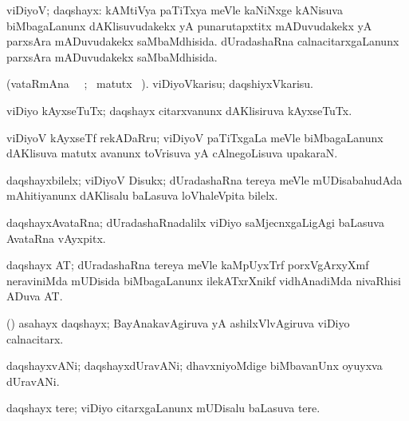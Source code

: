 {{{{{\bentry
{} 
\gl{\gu}
\expl{}
\bmng
viDiyoV; daqshayx: 
\banum
{} kAMtiVya paTiTxya meVle kaNiNxge kANisuva biMbagaLanunx dAKlisuvudakekx yA punarutapxtitx mADuvudakekx yA parxsAra mADuvudakekx saMbaMdhisida. 
 dUradashaRna calnacitarxgaLanunx parxsAra mADuvudakekx saMbaMdhisida. 
\eanum
\emng
\eentry

\bentry
{} 
\gl{\sakirx}(vataRmAna \parxpu\ \Eva\ ; \BU\ matutx
\BUkaq\ ). \bmng
 viDiyoVkarisu; daqshiyxVkarisu. 
\emng
\eentry

\bentry
{}
\gl{\nA}
\expl{}
\bmng
 viDiyo kAyxseTuTx; daqshayx citarxvanunx dAKlisiruva kAyxseTuTx. 
\emng
\eentry

\bentry
{}
\gl{\nA}
\expl{}
\bmng
 viDiyoV kAyxseTf rekADaRru; viDiyoV paTiTxgaLa meVle biMbagaLanunx dAKlisuva matutx avanunx toVrisuva yA cAlnegoLisuva upakaraN. 
\emng
\eentry

\bentry
{} 
\gl{\nA}
\expl{}
\bmng
 daqshayxbilelx; viDiyoV Disukx; dUradashaRna tereya meVle mUDisabahudAda mAhitiyanunx dAKlisalu baLasuva loVhaleVpita bilelx. 
\emng
\eentry

\bentry
{}
\gl{\nA}
\expl{}
\bmng
 daqshayxAvataRna; dUradashaRnadalilx viDiyo saMjecnxgaLigAgi baLasuva AvataRna vAyxpitx. 
\emng
\eentry

\bentry
{}
\gl{\nA}
\expl{}
\bmng
 daqshayx AT; dUradashaRna tereya meVle kaMpUyxTrf porxVgArxyXmf neraviniMda mUDisida biMbagaLanunx ilekATxrXnikf vidhAnadiMda nivaRhisi ADuva AT. 
\emng
\eentry

\bentry
{} 
\gl{\nA}
\expl{}
\bmng
 (\AmA) asahayx daqshayx; BayAnakavAgiruva yA ashilxVlvAgiruva viDiyo calnacitarx. 
\emng
\eentry

\bentry
{} 
\gl{\nA}
\expl{}
\bmng
 daqshayxvANi; daqshayxdUravANi; dhavxniyoMdige biMbavanUnx oyuyxva dUravANi. 
\emng
\eentry

\bentry
{}
\gl{\nA}
\expl{}
\bmng
\emng
\eentry

\bentry
{}
\gl{\nA}
\expl{}
\bmng
 daqshayx tere; viDiyo citarxgaLanunx mUDisalu baLasuva tere. 
\emng
\eentry

}}}}}
